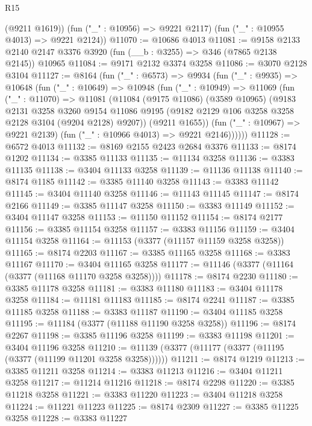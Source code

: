 \begin{lexlean}{R15}
\begin{coremodule}
        (@9211 @1619))
      (fun ("_" : @10956) => @9221 @2117)
      (fun ("_" : @10955 @4013) => @9221 @2124))
@11070 := @10686 @4013
@11081 := @9158 @2133 @2140 @2147 @3376 @3920 (fun (__b : @3255) => @346 (@7865 @2138 @2145)) @10965
@11084 := @9171 @2132 @3374 @3258
@11086 := @3070 @2128 @3104
@11127 := @8164
    (fun ("_" : @6573) =>
    @9934
      (fun ("_" : @9935) =>
      @10648
        (fun ("_" : @10649) =>
        @10948
          (fun ("_" : @10949) =>
          @11069
            (fun ("_" : @11070) =>
            @11081
              (@11084
                (@9175 @11086)
                (@3589 @10965)
                (@9183
                  @2131
                  @3258
                  @3260
                  @9154
                  @11086
                  @9195
                  (@9182 @2129 @106 @3258 @3258 @2128 @3104 (@9204 @2128) @9207))
                (@9211 @1655))
              (fun ("_" : @10967) => @9221 @2139)
              (fun ("_" : @10966 @4013) => @9221 @2146))))))
@11128 := @6572 @4013
@11132 := @8169 @2155 @2423 @2684 @3376
@11133 := @8174 @1202
@11134 := @3385 @11133
@11135 := @11134 @3258
@11136 := @3383 @11135
@11138 := @3404 @11133 @3258
@11139 := @11136 @11138
@11140 := @8174 @1185
@11142 := @3385 @11140 @3258
@11143 := @3383 @11142
@11145 := @3404 @11140 @3258
@11146 := @11143 @11145
@11147 := @8174 @2166
@11149 := @3385 @11147 @3258
@11150 := @3383 @11149
@11152 := @3404 @11147 @3258
@11153 := @11150 @11152
@11154 := @8174 @2177
@11156 := @3385 @11154 @3258
@11157 := @3383 @11156
@11159 := @3404 @11154 @3258
@11164 := @11153 (@3377 (@11157 @11159 @3258 @3258))
@11165 := @8174 @2203
@11167 := @3385 @11165 @3258
@11168 := @3383 @11167
@11170 := @3404 @11165 @3258
@11177 := @11146 (@3377 (@11164 (@3377 (@11168 @11170 @3258 @3258))))
@11178 := @8174 @2230
@11180 := @3385 @11178 @3258
@11181 := @3383 @11180
@11183 := @3404 @11178 @3258
@11184 := @11181 @11183
@11185 := @8174 @2241
@11187 := @3385 @11185 @3258
@11188 := @3383 @11187
@11190 := @3404 @11185 @3258
@11195 := @11184 (@3377 (@11188 @11190 @3258 @3258))
@11196 := @8174 @2267
@11198 := @3385 @11196 @3258
@11199 := @3383 @11198
@11201 := @3404 @11196 @3258
@11210 := @11139 (@3377 (@11177 (@3377 (@11195 (@3377 (@11199 @11201 @3258 @3258))))))
@11211 := @8174 @1219
@11213 := @3385 @11211 @3258
@11214 := @3383 @11213
@11216 := @3404 @11211 @3258
@11217 := @11214 @11216
@11218 := @8174 @2298
@11220 := @3385 @11218 @3258
@11221 := @3383 @11220
@11223 := @3404 @11218 @3258
@11224 := @11221 @11223
@11225 := @8174 @2309
@11227 := @3385 @11225 @3258
@11228 := @3383 @11227

\end{coremodule}
\end{lexlean}
